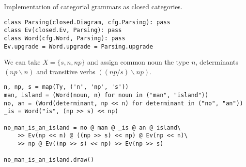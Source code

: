 \begin{python}
{\normalfont Implementation of categorial grammars as closed categories.}

\begin{verbatim}
class Parsing(closed.Diagram, cfg.Parsing): pass
class Ev(closed.Ev, Parsing): pass
class Word(cfg.Word, Parsing): pass
Ev.upgrade = Word.upgrade = Parsing.upgrade
\end{verbatim}
\end{python}

\begin{example}
We can take $X = \{ s, n, np \}$ and assign common noun the type $n$, determinants $(np \backslash n)$ and transitive verbs $((np / s) \backslash np)$.

\begin{verbatim}
n, np, s = map(Ty, ('n', 'np', 's'))
man, island = (Word(noun, n) for noun in ("man", "island"))
no, an = (Word(determinant, np << n) for determinant in ("no", "an"))
_is = Word("is", (np >> s) << np)

no_man_is_an_island = no @ man @ _is @ an @ island\
    >> Ev(np << n) @ ((np >> s) << np) @ Ev(np << n)\
    >> np @ Ev((np >> s) << np) >> Ev(np >> s)

no_man_is_an_island.draw()
\end{verbatim}

\end{example}

